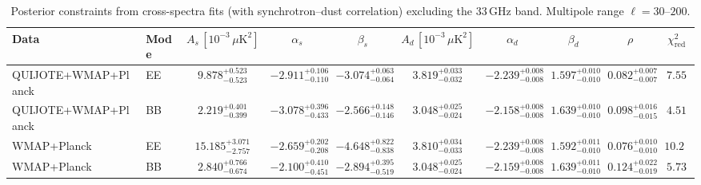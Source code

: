 \begin{table}[h]
\centering
\scriptsize
\setlength{\tabcolsep}{4pt}
\caption{Posterior constraints from cross-spectra fits (with synchrotron--dust correlation) excluding the 33\,GHz band. Multipole range $\ell=30$--$200$.}
\label{tab:fit_results_cross_no33}
\begin{tabular}{llcccccccc}
\toprule
Data & Mode & $A_s\,[10^{-3}\,\mu\mathrm{K}^2]$ & $\alpha_s$ & $\beta_s$ & $A_d\,[10^{-3}\,\mu\mathrm{K}^2]$ & $\alpha_d$ & $\beta_d$ & $\rho$ & $\chi^2_\mathrm{red}$ \\
\midrule
QUIJOTE+WMAP+Planck & EE & $9.878^{+0.523}_{-0.523}$ & $-2.911^{+0.106}_{-0.110}$ & $-3.074^{+0.063}_{-0.064}$ & $3.819^{+0.033}_{-0.032}$ & $-2.239^{+0.008}_{-0.008}$ & $1.597^{+0.010}_{-0.010}$ & $0.082^{+0.007}_{-0.007}$ & $7.55$ \\
QUIJOTE+WMAP+Planck & BB & $2.219^{+0.401}_{-0.399}$ & $-3.078^{+0.396}_{-0.433}$ & $-2.566^{+0.148}_{-0.146}$ & $3.048^{+0.025}_{-0.024}$ & $-2.158^{+0.008}_{-0.008}$ & $1.639^{+0.010}_{-0.010}$ & $0.098^{+0.016}_{-0.015}$ & $4.51$ \\
WMAP+Planck & EE & $15.185^{+3.071}_{-2.757}$ & $-2.659^{+0.202}_{-0.208}$ & $-4.648^{+0.822}_{-0.838}$ & $3.810^{+0.034}_{-0.033}$ & $-2.239^{+0.008}_{-0.008}$ & $1.592^{+0.011}_{-0.010}$ & $0.076^{+0.010}_{-0.010}$ & $10.20$ \\
WMAP+Planck & BB & $2.840^{+0.766}_{-0.674}$ & $-2.100^{+0.410}_{-0.451}$ & $-2.894^{+0.395}_{-0.519}$ & $3.048^{+0.025}_{-0.024}$ & $-2.159^{+0.008}_{-0.008}$ & $1.639^{+0.011}_{-0.010}$ & $0.124^{+0.022}_{-0.019}$ & $5.73$ \\
\bottomrule
\end{tabular}
\end{table}

